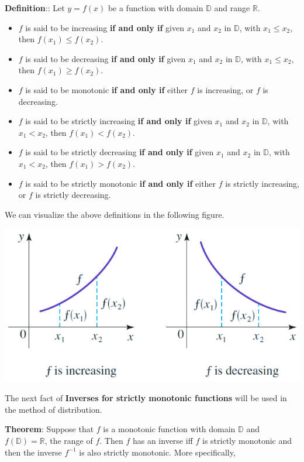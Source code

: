 \documentclass[
]{book}
\begin{document}
\textbf{\color{red} Definition}:: Let \(y = f(x)\) be a function with domain \(\mathbb{D}\) and range \(\mathbb{R}\).

\begin{itemize}
\item
  \(f\) is said to be increasing \textbf{if and only if} given \(x_1\) and \(x_2\) in \(\mathbb{D}\), with \(x_1 \le x_2\), then \(f(x_1) \le f(x_2)\).
\item
  \(f\) is said to be decreasing \textbf{if and only if} given \(x_1\) and \(x_2\) in \(\mathbb{D}\), with \(x_1 \le x_2\), then \(f(x_1) \ge f(x_2)\).
\item
  \(f\) is said to be monotonic \textbf{if and only if} either \(f\) is increasing, or \(f\) is decreasing.
\item
  \(f\) is said to be strictly increasing \textbf{if and only if} given \(x_1\) and \(x_2\) in \(\mathbb{D}\), with \(x_1 < x_2\), then \(f(x_1) < f(x_2)\).
\item
  \(f\) is said to be strictly decreasing \textbf{if and only if} given \(x_1\) and \(x_2\) in \(\mathbb{D}\), with \(x_1 < x_2\), then \(f(x_1) > f(x_2)\).
\item
  \(f\) is said to be strictly monotonic \textbf{if and only if} either \(f\) is strictly increasing, or \(f\) is strictly decreasing.
\end{itemize}

We can visualize the above definitions in the following figure.

\begin{center}\includegraphics[width=0.6\linewidth]{topic10/increasinganddecreasingfunctions2} \end{center}

The next fact of \textbf{Inverses for strictly monotonic functions} will be used in the method of distribution.

\textbf{\color{red} Theorem}: Suppose that \(f\) is a monotonic function with domain \(\mathbb{D}\) and \(f(\mathbb{D}) = \mathbb{R}\), the range of \(f\). Then \(f\) has an inverse iff \(f\) is strictly monotonic and then the inverse \(f^{-1}\) is also strictly monotonic. More specifically,
\end{document}
